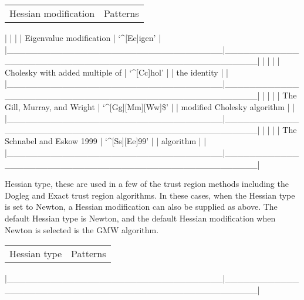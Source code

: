 \begin{tabular}{cc}
Hessian modification & Patterns \\
\end{tabular}
|                                   |                                                     |
| Eigenvalue modification           | `\^{}[Ee]igen'                                         |
|\_\_\_\_\_\_\_\_\_\_\_\_\_\_\_\_\_\_\_\_\_\_\_\_\_\_\_\_\_\_\_\_\_\_\_|\_\_\_\_\_\_\_\_\_\_\_\_\_\_\_\_\_\_\_\_\_\_\_\_\_\_\_\_\_\_\_\_\_\_\_\_\_\_\_\_\_\_\_\_\_\_\_\_\_\_\_\_\_|
|                                   |                                                     |
| Cholesky with added multiple of   | `\^{}[Cc]hol'                                          |
| the identity                      |                                                     |
|\_\_\_\_\_\_\_\_\_\_\_\_\_\_\_\_\_\_\_\_\_\_\_\_\_\_\_\_\_\_\_\_\_\_\_|\_\_\_\_\_\_\_\_\_\_\_\_\_\_\_\_\_\_\_\_\_\_\_\_\_\_\_\_\_\_\_\_\_\_\_\_\_\_\_\_\_\_\_\_\_\_\_\_\_\_\_\_\_|
|                                   |                                                     |
| The Gill, Murray, and Wright      | `\^{}[Gg][Mm][Ww]\$'                                    |
| modified Cholesky algorithm       |                                                     |
|\_\_\_\_\_\_\_\_\_\_\_\_\_\_\_\_\_\_\_\_\_\_\_\_\_\_\_\_\_\_\_\_\_\_\_|\_\_\_\_\_\_\_\_\_\_\_\_\_\_\_\_\_\_\_\_\_\_\_\_\_\_\_\_\_\_\_\_\_\_\_\_\_\_\_\_\_\_\_\_\_\_\_\_\_\_\_\_\_|
|                                   |                                                     |
| The Schnabel and Eskow 1999       | `\^{}[Ss][Ee]99'                                       |
| algorithm                         |                                                     |
|\_\_\_\_\_\_\_\_\_\_\_\_\_\_\_\_\_\_\_\_\_\_\_\_\_\_\_\_\_\_\_\_\_\_\_|\_\_\_\_\_\_\_\_\_\_\_\_\_\_\_\_\_\_\_\_\_\_\_\_\_\_\_\_\_\_\_\_\_\_\_\_\_\_\_\_\_\_\_\_\_\_\_\_\_\_\_\_\_|



Hessian type, these are used in a few of the trust region methods including the Dogleg and Exact
trust region algorithms.  In these cases, when the Hessian type is set to Newton, a Hessian
modification can also be supplied as above.  The default Hessian type is Newton, and the default
Hessian modification when Newton is selected is the GMW algorithm.


\begin{tabular}{cc}
Hessian type & Patterns \\
\end{tabular}
|\_\_\_\_\_\_\_\_\_\_\_\_\_\_\_\_\_\_\_\_\_\_\_\_\_\_\_\_\_\_\_\_\_\_\_|\_\_\_\_\_\_\_\_\_\_\_\_\_\_\_\_\_\_\_\_\_\_\_\_\_\_\_\_\_\_\_\_\_\_\_\_\_\_\_\_\_\_\_\_\_\_\_\_\_\_\_\_\_|


